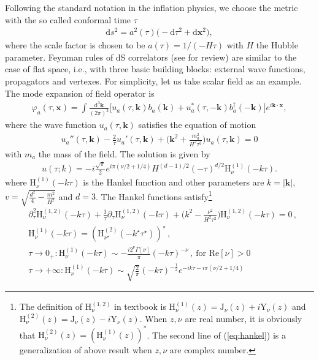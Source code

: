 \documentclass[a4paper,11pt]{article}
\newcommand{\nn}{\nonumber}
\newcommand{\nd}{\mathrm{d}}
\def\eqref#1{(\ref{#1})}
\begin{document}
Following  the standard notation in the inflation physics, we choose the  metric with the so called conformal time $\tau$
\begin{align}
  \nd s^2=a^2(\tau)\big(-\nd \tau^2+ \nd \bm{x}^2 \big), \label{metricCF}
\end{align}
where the scale factor is chosen to be $a(\tau) = 1/(-H\tau)$ with $H$ the Hubble parameter.  Feynman rules of dS correlators (see \cite{Chen:2017ryl} for review) are similar to the case of flat space, i.e., with three basic building blocks: external wave functions, propagators and vertexes. For simplicity, let us take scalar field as an example. The mode expansion of field operator is
\begin{align}
  \varphi_a(\tau,\bm{x})=\int \frac{\nd^3\bm{k}}{(2\pi)^3}\Big[u_a(\tau,\bm{k})b_a(\bm{k})+u_a^*(\tau,-\bm{k})b_a^\dag(-\bm{k})\Big]e^{i\bm{k}\cdot\bm{x}}, \label{fieldop}
\end{align}
where the wave function $u_a(\tau,\bm{k})$ satisfies the equation of motion
\begin{align}
  u_a''(\tau,\bm{k})-\frac{2}{\tau}u_a'(\tau,\bm{k})+\Big(\bm{k}^2+\frac{m_a^2}{H^2\tau^2}\Big)u_a(\tau,\bm{k})=0\label{eq:eom}
\end{align}
with $m_a$ the mass of the field. The solution is given by 
\begin{align}
  u(\tau;k)=-i\frac{\sqrt\pi}{2}e^{i\pi(\nu/2+1/4)}H^{(d-1)/2}(-\tau)^{d/2}\text{H}_{\nu}^{(1)}(-k\tau).
\end{align}
where $\text{H}_{\nu}^{(1)}(-k\tau)$ is the Hankel function and other parameters are 
$k=|\bm{k}|$, $v=\sqrt{\frac{d^2}{4}-\frac{m^2}{H^2}}$ and $d=3$.
The Hankel functions satisfy\footnote{The definition of $\text{H}_{\nu}^{(1,2)}$ in textbook is 
$\text{H}_{\nu}^{(1)}(z)= \text{J}_{\nu}(z)+ i \text{Y}_{\nu}(z)$ and $\text{H}_{\nu}^{(2)}(z)= \text{J}_{\nu}(z)- i \text{Y}_{\nu}(z)$. When $z,\nu$ are real number, it is obviously that $\text{H}_{\nu}^{(2)}(z)=(\text{H}_{\nu}^{(1)}(z))^*$. The second line  of \eqref{eq:hankel} is a generalization of above result when $z,\nu$ are complex number.} 
\begin{align}
  & \partial_\tau^2 \text{H}_{\nu}^{(1,2)}(-k\tau)+\frac{1}{\tau} \partial_\tau\text{H}_{\nu}^{(1,2)}(-k\tau)+\Big(k^2-\frac{\nu^2}{H^2 \tau^2}\Big)\text{H}_{\nu}^{(1,2)}(-k\tau)=0 \, ,\nn\\
  & \text{H}_{\nu}^{(1)}(-k\tau)= \left(\text{H}_{\nu^\star}^{(2)}(-k^\star\tau^\star) \right)^\star \, ,\nn\\
  &\tau\to 0_+ : \text{H}_{\nu}^{(1)}(-k\tau) \sim  - \frac{i 2^\nu \Gamma [\nu]}{\pi}  (-k \tau)^{-\nu}  \,, \ \text{for Re}[\nu] >0 \nn\\
  &\tau\to + \infty : \text{H}_{\nu}^{(1)}(-k\tau) \sim \sqrt{\frac{2}{\pi }} (-k \tau)^{ -\frac{1}{2}}  e^{-i k \tau-i \pi  \left(\nu/2+1/4\right)}
  \label{eq:hankel}
\end{align}
\end{document}
